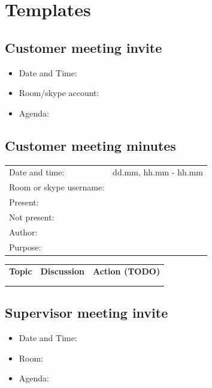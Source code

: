 \chapter{Templates}
\label{chap:templates}

\section{Customer meeting invite}

\begin{itemize}
	\item Date and Time:
	\item Room/skype account:
	\item Agenda:
\end{itemize}

\section{Customer meeting minutes}

\begin{tabular}{| p{3cm} | p{9cm} |}
	\hline
	\rowcolor{gray}
	\multicolumn{2}{|c|}{\Large \bf Meeting Minutes - Customer Meeting} \\ \hline
	Date and time: & dd.mm,  hh.mm - hh.mm \\ \hline
	Room or skype username: &  \\ \hline
	Present: &  \\ \hline
	Not present: &  \\ \hline
	Author: &  \\ \hline
	Purpose: &  \\ \hline
\end{tabular}

\begin{tabular}{| p{} | p{} | p{} |}
	\hline
	\rowcolor{gray}
	\multicolumn{3}{|c|}{\Large \bf Agenda} \\ \hline
	{\bf Topic} & {\bf Discussion} & {\bf Action (TODO)} \\ \hline
	& & \\ \hline
	& & \\ \hline
\end{tabular}

\section{Supervisor meeting invite}

\begin{itemize}
	\item Date and Time:
	\item Room:
	\item Agenda:
\end{itemize}

